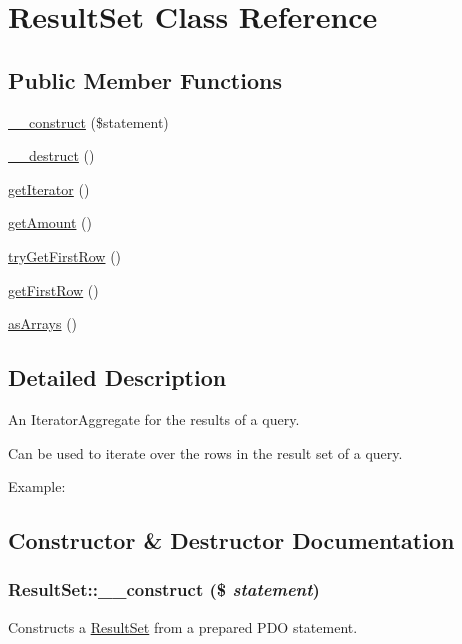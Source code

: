 \hypertarget{classResultSet}{
\section{ResultSet Class Reference}
\label{classResultSet}
}
\subsection*{Public Member Functions}
\begin{DoxyCompactItemize}
\item 
\hyperlink{classResultSet_ac86b486df597ae5b9e54149da234914f}{\_\-\_\-construct} (\$statement)
\item 
\hyperlink{classResultSet_a01538a6f9a53136f188d44b85b4835cd}{\_\-\_\-destruct} ()
\item 
\hyperlink{classResultSet_a8eb3574cf0f0176005f873c4f85d18d1}{getIterator} ()
\item 
\hyperlink{classResultSet_a5f84a517e8af2bdd202b663f7e63a943}{getAmount} ()
\item 
\hyperlink{classResultSet_ab677b0700c7706b6be5d01c9aa733140}{tryGetFirstRow} ()
\item 
\hyperlink{classResultSet_af7f034541c0d410bd2def9925074a993}{getFirstRow} ()
\item 
\hyperlink{classResultSet_aedc1f5a1d07f1a027eeceb1ff4c02225}{asArrays} ()
\end{DoxyCompactItemize}


\subsection{Detailed Description}
An IteratorAggregate for the results of a query.

Can be used to iterate over the rows in the result set of a query.

Example: 
 

\subsection{Constructor \& Destructor Documentation}
\hypertarget{classResultSet_ac86b486df597ae5b9e54149da234914f}{
\subsubsection[{\_\-\_\-construct}]{\setlength{\rightskip}{0pt plus 5cm}ResultSet::\_\-\_\-construct (\$ {\em statement})}}
\label{classResultSet_ac86b486df597ae5b9e54149da234914f}
Constructs a \hyperlink{classResultSet}{ResultSet} from a prepared PDO statement.


